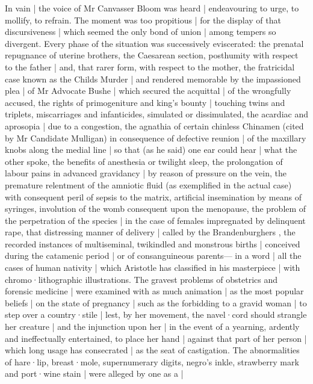 In vain |
the voice of Mr Canvasser Bloom was heard |
endeavouring to urge,
to mollify,
to refrain.
The moment was too propitious |
for the display of that discursiveness |
which seemed the only bond of union |
among tempers so divergent.
Every phase of the situation was successively eviscerated:
the prenatal repugnance of uterine brothers,
the Caesarean section,
posthumity with respect to the father |
and,
that rarer form,
with respect to the mother,
the fratricidal case known as the Childs Murder |
and rendered memorable by the impassioned plea |
of Mr Advocate Bushe |
which secured the acquittal |
of the wrongfully accused,
the rights of primogeniture and king's bounty |
touching twins and triplets,
miscarriages and infanticides,
simulated or dissimulated,
the acardiac  and aprosopia |
due to a congestion,
the agnathia of certain chinless Chinamen
(cited by Mr Candidate Mulligan)
in consequence of defective reunion |
of the maxillary knobs along the medial line |
so that
(as he said)
one ear could hear |
what the other spoke,
the benefits of anesthesia or twilight sleep,
the prolongation of labour pains in advanced gravidancy |
by reason of pressure on the vein,
the premature relentment of the amniotic fluid
(as exemplified in the actual case)
with consequent peril of sepsis to the matrix,
artificial insemination by means of syringes,
involution of the womb consequent upon the menopause,
the problem of the perpetration of the species |
in the case of females impregnated by delinquent rape,
that distressing manner of delivery |
called by the Brandenburghers ,
the recorded instances of multiseminal,
twikindled and monstrous births |
conceived during the catamenic period |
or of consanguineous parents---%
in a word |
all the cases of human nativity |
which Aristotle has classified in his masterpiece |
with chromo·lithographic illustrations.
The gravest problems of obstetrics and forensic medicine |
were examined with as much animation |
as the most popular beliefs |
on the state of pregnancy |
such as the forbidding to a gravid woman |
to step over a country·stile |
lest,
by her movement,
the navel·cord should strangle her creature |
and the injunction upon her |
in the event of a yearning,
ardently and ineffectually entertained,
to place her hand |
against that part of her person |
which long usage has consecrated |
as the seat of castigation.
The abnormalities of hare·lip,
breast·mole,
supernumerary digits,
negro's inkle,
strawberry mark and port·wine stain |
were alleged by one as a  |
